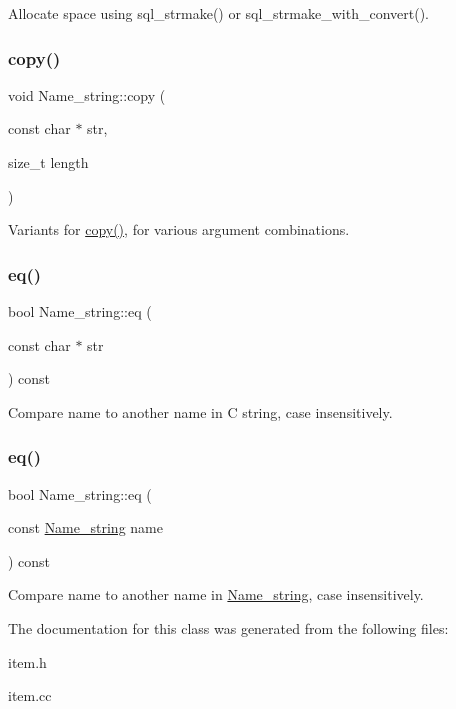 Allocate space using sql\+\_\+strmake() or sql\+\_\+strmake\+\_\+with\+\_\+convert(). \mbox{\label{className__string_a9e0c169b1a92030ea8b43ab76984c604}} 
\subsubsection{\texorpdfstring{copy()}{copy()}\hspace{0.1cm}{\footnotesize\ttfamily [2/2]}}
{\footnotesize\ttfamily void Name\+\_\+string\+::copy (\begin{DoxyParamCaption}\item[{const char $\ast$}]{str,  }\item[{size\+\_\+t}]{length }\end{DoxyParamCaption})\hspace{0.3cm}{\ttfamily [inline]}}

Variants for \mbox{\hyperlink{className__string_ad2f16ca58a7fd5438005f065d6daf345}{copy()}}, for various argument combinations. \mbox{\label{className__string_a99fc935131dae337de98c11e36c6c3dd}} 
\subsubsection{\texorpdfstring{eq()}{eq()}\hspace{0.1cm}{\footnotesize\ttfamily [1/2]}}
{\footnotesize\ttfamily bool Name\+\_\+string\+::eq (\begin{DoxyParamCaption}\item[{const char $\ast$}]{str }\end{DoxyParamCaption}) const\hspace{0.3cm}{\ttfamily [inline]}}

Compare name to another name in C string, case insensitively. \mbox{\label{className__string_ae359df5c3df3e956a9fe215e1aa9eba9}} 
\subsubsection{\texorpdfstring{eq()}{eq()}\hspace{0.1cm}{\footnotesize\ttfamily [2/2]}}
{\footnotesize\ttfamily bool Name\+\_\+string\+::eq (\begin{DoxyParamCaption}\item[{const \mbox{\hyperlink{className__string}{Name\+\_\+string}}}]{name }\end{DoxyParamCaption}) const\hspace{0.3cm}{\ttfamily [inline]}}

Compare name to another name in \mbox{\hyperlink{className__string}{Name\+\_\+string}}, case insensitively. 

The documentation for this class was generated from the following files\+:\begin{DoxyCompactItemize}
\item 
item.\+h\item 
item.\+cc\end{DoxyCompactItemize}
